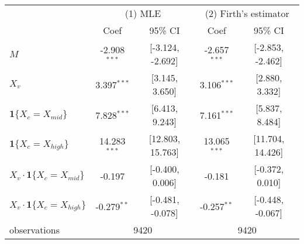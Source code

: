 \begin{tabular}{lcccc}
  \hline
   & \multicolumn{2}{c}{(1) MLE} & \multicolumn{2}{c}{(2) Firth's estimator} \\ & Coef & 95\% CI & Coef & 95\% CI \\ \hline
$M$ & -2.908$^{***}$ & [-3.124, -2.692] & -2.657$^{***}$ & [-2.853, -2.462] \\ 
  $X_v$ & 3.397$^{***}$ & [3.145, 3.650] & 3.106$^{***}$ & [2.880, 3.332] \\ 
  $\textbf{1}\{X_c = X_{mid}\}$ & 7.828$^{***}$ & [6.413, 9.243] & 7.161$^{***}$ & [5.837, 8.484] \\ 
  $\textbf{1}\{X_c = X_{high}\}$ & 14.283$^{***}$ & [12.803, 15.763] & 13.065$^{***}$ & [11.704, 14.426] \\ 
  $X_v\cdot\textbf{1}\{X_c = X_{mid}\}$ & -0.197 & [-0.400, 0.006] & -0.181 & [-0.372, 0.010] \\ 
  $X_v\cdot\textbf{1}\{X_c = X_{high}\}$ & -0.279$^{**}$ & [-0.481, -0.078] & -0.257$^{**}$ & [-0.448, -0.067] \\ 
   \hline observations & \multicolumn{2}{c}{9420} & \multicolumn{2}{c}{9420} \\ \hline
\end{tabular}


